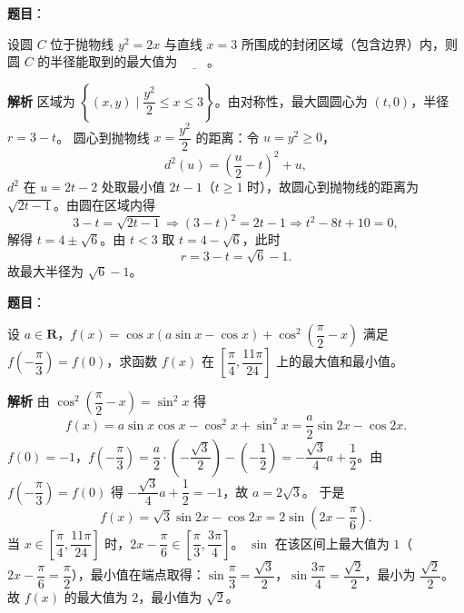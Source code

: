 \begin{answer}

\textbf{题目}：

设圆 $C$ 位于抛物线 $y^2=2x$ 与直线 $x=3$ 所围成的封闭区域（包含边界）内，则圆 $C$ 的半径能取到的最大值为 $\underline{\qquad}$。

\textbf{解析}
区域为 $\left\{(x,y)\mid \dfrac{y^2}2\leqslant x\leqslant3\right\}$。由对称性，最大圆圆心为 $(t,0)$，半径 $r=3-t$。
圆心到抛物线 $x=\dfrac{y^2}2$ 的距离：令 $u=y^2\geqslant0$，
\nopagebreak[4]
\[d^2(u)=\left(\frac u2-t\right)^2+u,\]
$d^2$ 在 $u=2t-2$ 处取最小值 $2t-1$（$t\geqslant1$ 时），故圆心到抛物线的距离为 $\sqrt{2t-1}$。由圆在区域内得
\nopagebreak[4]
\[3-t=\sqrt{2t-1}\Longrightarrow(3-t)^2=2t-1\Longrightarrow t^2-8t+10=0,\]
解得 $t=4\pm\sqrt6$。由 $t<3$ 取 $t=4-\sqrt6$，此时
\nopagebreak[4]
\[r=3-t=\sqrt6-1.\]
故最大半径为 $\sqrt6-1$。


\end{answer}
\begin{answer}

\textbf{题目}：

设 $a\in\mathbf R$，$f(x)=\cos x(a\sin x-\cos x)+\cos^2\left(\dfrac\pi2-x\right)$ 满足 $f\left(-\dfrac\pi3\right)=f(0)$，求函数 $f(x)$ 在 $\left[\dfrac\pi4,\dfrac{11\pi}{24}\right]$ 上的最大值和最小值。

\textbf{解析}
由 $\cos^2\left(\dfrac\pi2-x\right)=\sin^2x$ 得
\nopagebreak[4]
\[f(x)=a\sin x\cos x-\cos^2x+\sin^2x=\frac a2\sin2x-\cos2x.\]
$f(0)=-1$，$f\left(-\dfrac\pi3\right)=\dfrac a2\cdot\left(-\dfrac{\sqrt3}2\right)-\left(-\dfrac12\right)=-\dfrac{\sqrt3}4a+\dfrac12$。由 $f\left(-\dfrac\pi3\right)=f(0)$ 得 $-\dfrac{\sqrt3}4a+\dfrac12=-1$，故 $a=2\sqrt3$。
于是
\nopagebreak[4]
\[f(x)=\sqrt3\sin2x-\cos2x=2\sin\left(2x-\frac\pi6\right).\]
当 $x\in\left[\dfrac\pi4,\dfrac{11\pi}{24}\right]$ 时，$2x-\dfrac\pi6\in\left[\dfrac\pi3,\dfrac{3\pi}4\right]$。
$\sin$ 在该区间上最大值为 $1$（$2x-\dfrac\pi6=\dfrac\pi2$），最小值在端点取得：$\sin\dfrac\pi3=\dfrac{\sqrt3}2$，$\sin\dfrac{3\pi}4=\dfrac{\sqrt2}2$，最小为 $\dfrac{\sqrt2}2$。
故 $f(x)$ 的最大值为 $2$，最小值为 $\sqrt2$。


\end{answer}
